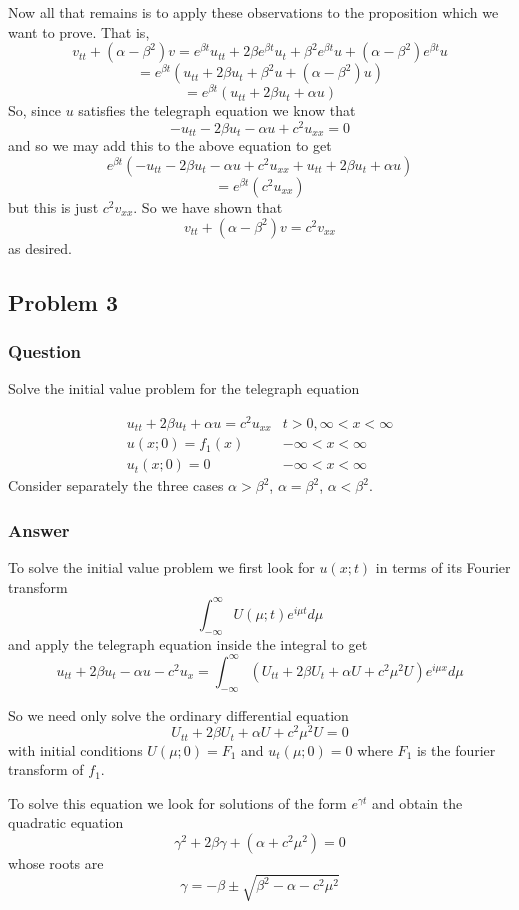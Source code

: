 \documentclass[12pt]{article}
\begin{document}
Now all that remains is to apply these observations to the proposition which we want to prove. That is,
\[v_{tt}+(\alpha-\beta^2)v=e^{\beta t}u_{tt}+2 \beta e^{\beta t}u_t+\beta^2 e^{\beta t} u+(\alpha-\beta^2)e^{\beta t}u\]
\[=e^{\beta t}\left( u_{tt}+2 \beta  u_t+\beta^2   u+(\alpha-\beta^2) u \right) \]
\[=e^{\beta t}\left( u_{tt}+2 \beta  u_t+ \alpha u \right) \]
So, since $u$ satisfies the telegraph equation we know that
\[-u_{tt}-2 \beta u_t -\alpha u + c^2 u_{xx}=0\]
and so we may add this to the above equation to get
\[e^{\beta t}\left(-u_{tt}-2 \beta u_t -\alpha u + c^2 u_{xx}+ u_{tt}+2 \beta  u_t+ \alpha u \right) \]
\[=e^{\beta t}\left(c^2 u_{xx}\right) \]
but this is just  $c^2 v_{xx}$. So we have shown that
\[v_{tt}+(\alpha-\beta^2)v=c^2 v_{xx}\]
as desired.

\subsection{Problem 3}
\subsubsection{Question}
Solve the initial value problem for the telegraph equation

\[
\begin{array}{cc}
u_{tt}+2 \beta u_t+ \alpha u=c^2 u_{xx} & t>0,\infty<x<\infty \\
u(x;0)=f_1(x) & -\infty<x<\infty \\
u_t(x;0) = 0 & -\infty<x<\infty
\end{array}
\]
Consider separately the three cases $\alpha > \beta^2$, $\alpha=\beta^2$, $\alpha<\beta^2$.

\subsubsection{Answer}
To solve the initial value problem we first look for $u(x;t)$ in terms of its Fourier transform
\[\int_{-\infty}^{\infty} U(\mu;t) e^{i\mu t} d\mu\]
and apply the telegraph equation inside the integral to get
\[u_{tt}+2 \beta u_t - \alpha u - c^2 u_x =\int_{-\infty}^{\infty} \left( U_{tt} +2 \beta U_t +\alpha U + c^2\mu^2 U\right) e^{i \mu x} d\mu \]

So we need only solve the ordinary differential equation 
\[U_{tt} +2 \beta U_t +\alpha U + c^2\mu^2 U=0\]
with initial conditions $U(\mu;0)=F_1$ and $u_t(\mu;0)=0$ where $F_1$ is the fourier transform of $f_1$.

To solve this equation we look for solutions of the form $e^{\gamma t}$ and obtain the quadratic equation
\[\gamma^2 +2 \beta \gamma +(\alpha +c^2\mu^2)=0\]
whose roots are
\[\gamma=-\beta \pm \sqrt{\beta^2 - \alpha -c^2\mu^2}\]
\end{document}

